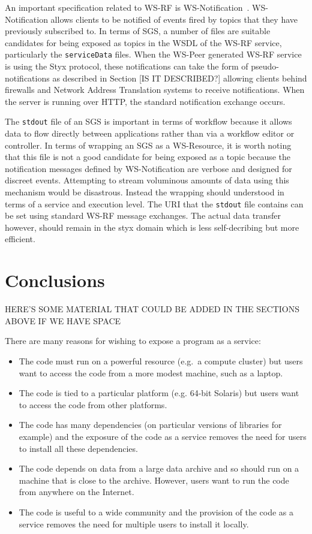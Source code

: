 \documentclass{llncs}
\begin{document}
An important specification related to WS-RF is WS-Notification~\cite{wsrf-notification}. WS-Notification allows clients to be notified of events fired by topics that they have previously subscribed to. In terms of SGS, a number of files are suitable candidates for being exposed as topics in the WSDL of the WS-RF service, particularly the \texttt{serviceData} files. When the WS-Peer generated WS-RF service is using the Styx protocol, these notifications can take the form of pseudo-notifications as described in Section [IS IT DESCRIBED?] allowing clients behind firewalls and Network Address Translation systems to receive notifications. When the server is running over HTTP, the standard notification exchange occurs.

The \texttt{stdout} file of an SGS is important in terms of workflow because it allows data to flow directly between applications rather than via a workflow editor or controller. In terms of wrapping an SGS as a WS-Resource, it is worth noting that this file is not a good candidate for being exposed as a topic  because the notification messages defined by WS-Notification are verbose and designed for discreet events. Attempting to stream voluminous amounts of data using this mechanism would be disastrous. Instead the wrapping should understood in terms of a service and execution level. The URI that the \texttt{stdout} file contains can be set using standard WS-RF message exchanges. The actual data transfer however, should remain in the styx domain which is less self-decribing but more efficient.


\section{Conclusions}

HERE'S SOME MATERIAL THAT COULD BE ADDED IN THE SECTIONS ABOVE IF WE HAVE SPACE

There are many reasons for wishing to expose a program as a service:
\begin{itemize}
	\item The code must run on a powerful resource (e.g.\ a compute cluster) but users want to access the code from a more modest machine, such as a laptop.
	\item The code is tied to a particular platform (e.g. 64-bit Solaris) but users want to access the code from other platforms.
	\item The code has many dependencies (on particular versions of libraries for example) and the exposure of the code as a service removes the need for users to install all these dependencies.
	\item The code depends on data from a large data archive and so should run on a machine that is close to the archive.  However, users want to run the code from anywhere on the Internet.
	\item The code is useful to a wide community and the provision of the code as a service removes the need for multiple users to install it locally.
\end{itemize}
\end{document}
